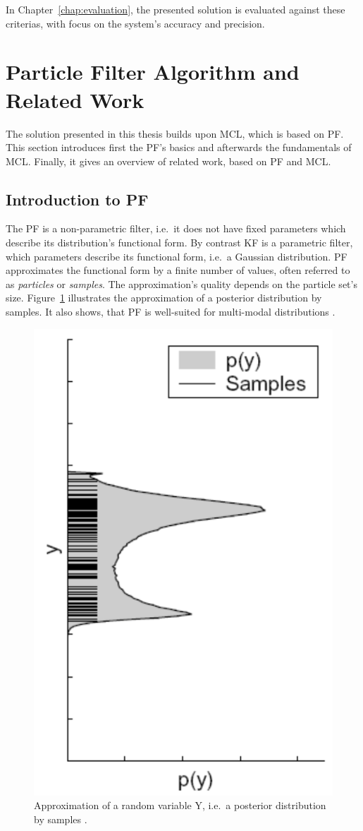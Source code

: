 \noindent In Chapter~\ref{chap:evaluation}, the presented solution is evaluated against these criterias, with focus on the system's accuracy and precision.


\section{Particle Filter Algorithm and Related Work}\label{sec:fund_pf}
The solution presented in this thesis builds upon \acf{MCL}, which is based on \acf{PF}. This section introduces first the \ac{PF}'s basics and afterwards the fundamentals of \ac{MCL}. Finally, it gives an overview of related work, based on \ac{PF} and \ac{MCL}.

\subsection{Introduction to \acl{PF}}
The \ac{PF} is a non-parametric filter, i.e.\ it does not have fixed parameters which describe its distribution's functional form. By contrast \acf{KF} is a parametric filter, which parameters describe its functional form, i.e.\ a Gaussian distribution. \ac{PF} approximates the functional form by a finite number of values, often referred to as \emph{particles} or \emph{samples}. The approximation's quality depends on the particle set's size. Figure~\ref{fig:pf_approx} illustrates the approximation of a posterior distribution by samples. It also shows, that \ac{PF} is well-suited for multi-modal distributions \citep{thrun:prob_robo}.

\begin{figure}
	\includegraphics[height=0.45\textwidth]{figures/pf_approx}
	\caption{Approximation of a random variable Y, i.e.\ a posterior distribution by samples \citep[p.97]{thrun:prob_robo}.}
	\label{fig:pf_approx}
\end{figure} 


